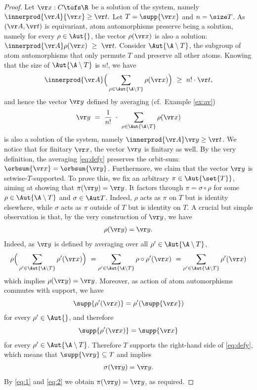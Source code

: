 \begin{proof}
Let $\vr x : C\tofs \R$ be a solution of the system, namely $\innerprod{\vr A}{\vr x}\geq \vr t.$
Let $T = \supp {\vr x}$ and $n= \size T$.
As $(\vr A, \vr t)$ is equivariant,
atom automorphisms 
preserve being a solution, namely
for every $\rho \in \Aut {}$, the vector $\rho(\vr x)$ is also a solution:
$
\innerprod {\vr A} \rho(\vr x) \ \geq \  \vr t.
$
Consider $\Aut{\A\setminus T}$, the subgroup of atom automorphisms that only permute $T$ and preserve
all other atoms.
Knowing that the size of $\Aut{\A\setminus T}$ is $n!$, we have
\[
\innerprod {\vr A} \Big(\sum_{\rho \in \Aut{\A\setminus T}}\rho(\vr x)\Big) \ \geq \ n! \cdot \vr t,
\]
and hence the vector $\vr y$ defined by averaging (cf.~Example \ref{ex:av})
\begin{align} \label{eq:defy}
\vr y \ = \ \frac{1}{n!} \ \cdot \ \sum_{\rho \in \Aut{\A\setminus T}} \rho(\vr x)
\end{align}
is also a solution of the system, namely $\innerprod {\vr A} \vr y  \geq  \vr t$.
We notice that for finitary $\vr x$, the vector $\vr y$ is finitary as well.
By the very definition, the averaging \eqref{eq:defy} preserves the orbit-sum:
$\orbsum{\vr x} = \orbsum{\vr y}$.
Furthermore, we claim that the vector $\vr y$ is setwise-$T$-supported.
To prove this, we fix an arbitrary $\pi \in \Aut {\set{T}}$, aiming at showing
that $\pi(\vr y) = \vr y$.
It factors through
$
\pi = \sigma \circ \rho
$
for some $\rho \in \Aut{\A\setminus T}$ and $\sigma \in \Aut T$.
Indeed, $\rho$ acts as $\pi$ on $T$ but is identity elsewhere, while
$\sigma$ acts as $\pi$ outside of $T$ but is identity on $T$.
%
%
A crucial but simple observation is that, 
by the very construction of $\vr y$, we have 
\begin{align} \label{eq:1}
\rho(\vr y) = \vr y.
\end{align}
Indeed, as $\vr y$ is defined by averaging over all $\rho'\in\Aut{\A\setminus T}$, 
\[
\rho \Big(\sum_{\rho' \in \Aut{\A\setminus T}}\rho'(\vr x)\Big) \ =
\sum_{\rho' \in \Aut{\A\setminus T}}\rho\circ\rho'(\vr x) \ =
\sum_{\rho' \in \Aut{\A\setminus T}}\rho'(\vr x)
\]
which implies $\rho(\vr y) = \vr y$.
Moreover, as action of atom automorphisms commutes with support, we have
\[
\supp {\rho'(\vr x)} = \rho'(\supp{\vr x})
\]
for every $\rho' \in \Aut{}$, and therefore 
\[
\supp {\rho'(\vr x)} = \supp{\vr x}
\]
for every $\rho' \in \Aut{\A\setminus T}$. 
Therefore $T$ supports the right-hand side of \eqref{eq:defy}, which means that
$\supp {\vr y} \subseteq T$ and implies
%
%
\begin{align} \label{eq:2}
\sigma(\vr y) = \vr y.
\end{align}
By \eqref{eq:1} and \eqref{eq:2} we obtain $\pi(\vr y) = \vr y$, as required.


\end{proof}
